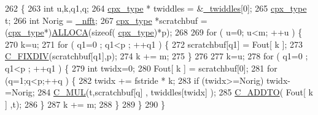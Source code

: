 \begin{DoxyCode}
262         \{
263             \textcolor{keywordtype}{int} u,k,q1,q;
264             \hyperlink{classkissfft_af66664488b0b1b2995f3e4c2f63a8b7d}{cpx\_type} * twiddles = &\hyperlink{classkissfft_abd5d6e3a0d08f56c711590d890fdd740}{\_twiddles}[0];
265             \hyperlink{classkissfft_af66664488b0b1b2995f3e4c2f63a8b7d}{cpx\_type} t;
266             \textcolor{keywordtype}{int} Norig = \hyperlink{classkissfft_abbfab972dff7a11d401150233e54041d}{\_nfft};
267             \hyperlink{classkissfft_af66664488b0b1b2995f3e4c2f63a8b7d}{cpx\_type} *scratchbuf = (\hyperlink{classkissfft_af66664488b0b1b2995f3e4c2f63a8b7d}{cpx\_type}*)\hyperlink{std__incl_8h_a72fc0ed307a114ba9a46ebd095267d2f}{ALLOCA}(\textcolor{keyword}{sizeof}(
      \hyperlink{classkissfft_af66664488b0b1b2995f3e4c2f63a8b7d}{cpx\_type})*p);
268 
269             \textcolor{keywordflow}{for} ( u=0; u<m; ++u ) \{
270                 k=u;
271                 \textcolor{keywordflow}{for} ( q1=0 ; q1<p ; ++q1 ) \{
272                     scratchbuf[q1] = Fout[ k  ];
273                     \hyperlink{classkissfft_aef8eb1d4326ae5c6a94ad71af0af87c5}{C\_FIXDIV}(scratchbuf[q1],p);
274                     k += m;
275                 \}
276 
277                 k=u;
278                 \textcolor{keywordflow}{for} ( q1=0 ; q1<p ; ++q1 ) \{
279                     \textcolor{keywordtype}{int} twidx=0;
280                     Fout[ k ] = scratchbuf[0];
281                     \textcolor{keywordflow}{for} (q=1;q<p;++q ) \{
282                         twidx += fstride * k;
283                         \textcolor{keywordflow}{if} (twidx>=Norig) twidx-=Norig;
284                         \hyperlink{classkissfft_afa4efc3959abe6bb1e4c10f4442fed07}{C\_MUL}(t,scratchbuf[q] , twiddles[twidx] );
285                         \hyperlink{classkissfft_a1cb327491bc3dce979631f5c2ebd142a}{C\_ADDTO}( Fout[ k ] ,t);
286                     \}
287                     k += m;
288                 \}
289             \}
290         \}
\end{DoxyCode}
